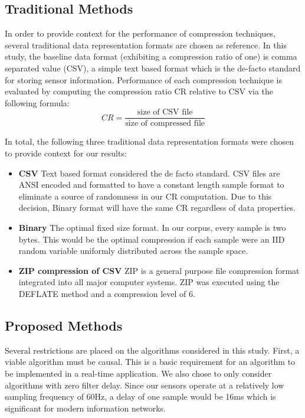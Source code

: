 \documentclass[journal]{IEEEtran}
\begin{document}
\subsection{Traditional Methods}
In order to provide context for the performance of compression techniques, several traditional data representation formats are chosen as reference. In this study, the baseline data format (exhibiting a compression ratio of one) is comma separated value (CSV), a simple text based format which is the de-facto standard for storing sensor information. Performance of each compression technique is evaluated by computing the compression ratio CR relative to CSV via the following formula:
$$CR = \frac{\textrm{size of CSV file}}{\textrm{size of compressed file}}$$

In total, the following three traditional data representation formats were chosen to provide context for our results:

\begin{itemize}
  \item \textbf{CSV} Text based format considered the de facto standard. CSV files are ANSI encoded and formatted to have a constant length sample format to eliminate a source of randomness in our CR computation. Due to this decision, Binary format will have the same CR regardless of data properties. 
  \item \textbf{Binary} The optimal fixed size format. In our corpus, every sample is two bytes. This would be the optimal compression if each sample were an IID random variable uniformly distributed across the sample space.
  \item \textbf{ZIP compression of CSV} ZIP is a general purpose file compression format integrated into all major computer systems. ZIP was executed using the DEFLATE method \cite{Deutsch1996} and a compression level of 6.
\end{itemize}
\subsection{Proposed Methods}


Several restrictions are placed on the algorithms considered in this study. First, a viable algorithm must be causal. This is a basic requirement for an algorithm to be implemented in a real-time application. We also chose to only consider algorithms with zero filter delay. Since our sensors operate at a relatively low sampling frequency of 60Hz, a delay of one sample would be 16ms which is significant for modern information networks.
\end{document}
